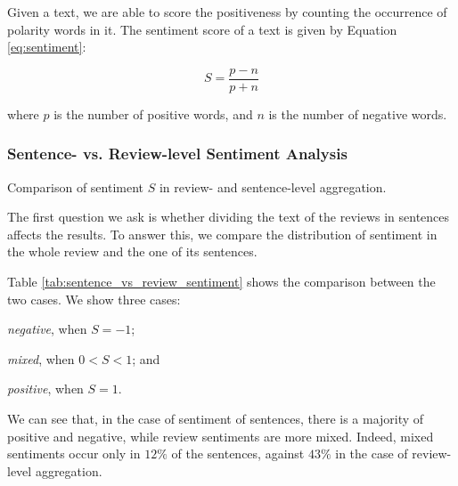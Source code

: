 Given a text, we are able to score the positiveness by counting the occurrence of polarity words in it. The sentiment score of a text is given by Equation \ref{eq:sentiment}:

\begin{equation}
\label{eq:sentiment}
	S = \frac{p - n}{p + n}
\end{equation}

where $p$ is the number of positive words, and $n$ is the number of negative words.

\subsubsection{Sentence- vs. Review-level Sentiment Analysis}
\label{sec:sentimentSentence}

\begin{table}
\begin{center}
\caption{Comparison of sentiment $S$ in review- and sentence-level aggregation.}
\label{tab:sentence_vs_review_sentiment}
\end{center}
\end{table}

The first question we ask is whether dividing the text of the reviews in sentences affects the results. To answer this, we compare the distribution of sentiment in the whole review and the one of its sentences.

Table \ref{tab:sentence_vs_review_sentiment} shows the comparison between the two cases. We show three cases: 
\begin{inparaenum}
	\item \emph{negative}, when $S = -1$;
	\item \emph{mixed}, when $0<S<1$; and
	\item \emph{positive}, when $S = 1$.
\end{inparaenum}
We can see that, in the case of sentiment of sentences, there is a majority of positive and negative, while review sentiments are more mixed. Indeed, mixed sentiments occur only in $12\%$ of the sentences, against $43\%$ in the case of review-level aggregation.

